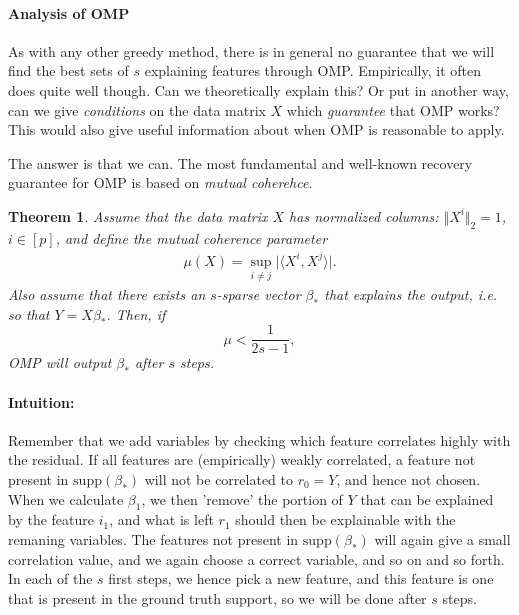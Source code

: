 \documentclass{article}
\newcommand{\sprod}[1]{\langle #1 \rangle}
\newtheorem{theorem}{Theorem}
\newcommand{\abs}[1]{\vert #1 \vert}
\newcommand{\norm}[1]{\Vert #1 \Vert}
\begin{document}
\paragraph{Analysis of OMP}
As with any other greedy method, there is in general no guarantee that we will find the best sets of $s$ explaining features through OMP. Empirically, it often does quite well though. Can we theoretically explain this? Or put in another way, can we give \emph{conditions} on the data matrix $X$ which \emph{guarantee} that OMP works? This would also give useful information about when OMP is reasonable to apply.

The answer is that we can. The most fundamental and well-known recovery guarantee for OMP is based on \emph{mutual coherehce.}
\begin{theorem} \label{th:OMP}
    Assume that the data matrix $X$ has normalized columns: $\norm{X^i}_2=1$, $i\in [p]$, and define the \emph{mutual coherence} parameter
    \begin{align*}
        \mu(X) = \sup_{i \neq j } \abs{\sprod{X^i,X^j}}.
    \end{align*}
    Also assume that there exists an $s$-sparse vector $\beta_*$ that explains the output, i.e. so that $Y=X\beta_*$. Then, if $$\mu < \frac{1}{2s-1},$$ OMP will output $\beta_*$ after $s$ steps. 
\end{theorem}
\paragraph{Intuition:} Remember that we add variables by checking which feature correlates highly with the residual. If all features are (empirically) weakly correlated, a feature not present in $\mathrm{supp}(\beta_*)$ will not be correlated to $r_0=Y$, and hence not chosen. When we calculate $\beta_1$, we then 'remove' the portion of $Y$ that can be explained by the feature $i_1$, and what is left $r_1$ should then be explainable with the remaning variables. The features not present in $\mathrm{supp}(\beta_*)$ will again give a small correlation value, and we again choose a correct variable, and so on and so forth. In each of the $s$ first steps, we hence pick a new feature, and this feature is one that is present in the ground truth support, so we will be done after $s$ steps.
\end{document}
